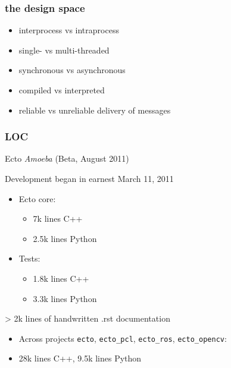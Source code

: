 \begin{frame}[fragile]
\frametitle{the design space}

\begin{itemize}[<alert@+>]

\item interprocess vs intraprocess

\item single- vs multi-threaded

\item synchronous vs asynchronous

\item compiled vs interpreted

\item reliable vs unreliable delivery of messages
\end{itemize}
\end{frame}

\begin{frame}[fragile]
\frametitle{LOC}


Ecto \emph{Amoeba} (Beta, August 2011)

Development began in earnest March 11, 2011
\begin{itemize}

\item Ecto core:
\begin{itemize}

\item 7k lines C++

\item 2.5k lines Python
\end{itemize}

\item Tests:
\begin{itemize}

\item 1.8k lines C++

\item 3.3k lines Python
\end{itemize}
\end{itemize}

> 2k lines of handwritten .rst documentation

\begin{itemize}
\item Across projects \texttt{ecto}, \texttt{ecto\_pcl}, \texttt{ecto\_ros}, \texttt{ecto\_opencv}:
\item 28k lines C++, 9.5k lines Python
\end{itemize}

\end{frame}

